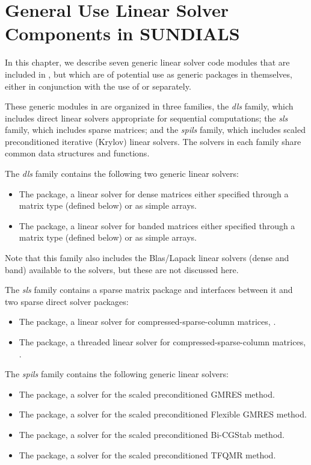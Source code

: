 \chapter{General Use Linear Solver Components in SUNDIALS}\label{s:gen_linsolv}
In this chapter, we describe seven generic linear solver code modules that 
are included in {\sundials}, 
but which are of potential use as generic packages in
themselves, either in conjunction with the use of {\sundials} or separately.

These generic modules in {\sundials} are organized in
three families, the {\em dls} family, which includes direct
linear solvers appropriate for sequential computations; the {\em sls}
family, which includes sparse matrices; and the {\em spils}
family, which includes scaled preconditioned iterative (Krylov) linear solvers.
The solvers in each family share common data structures and functions.

The {\em dls} family contains the following two generic linear solvers:
\begin{itemize}
\item The {\dense} package, a linear solver for dense matrices either specified 
  through a matrix type (defined below) or as simple arrays.
\item The {\band} package, a linear solver for banded matrices either specified 
  through a matrix type (defined below) or as simple arrays.
\end{itemize}
Note that this family also includes the Blas/Lapack linear solvers (dense and band) 
available to the {\sundials} solvers, but these are not discussed here.

The {\em sls} family contains a sparse matrix package and interfaces between
it and two sparse direct solver packages:
\begin{itemize}
\item The {\klu} package, a linear solver for compressed-sparse-column
  matrices, \cite{KLU_site,DaPa:10}.
\item The {\superlumt} package, a threaded linear solver for
  compressed-sparse-column matrices, \cite{SuperLUMT_site,Li:05,DGL:99}.
\end{itemize}

The {\em spils} family contains the following generic linear solvers:
\begin{itemize}
\item The {\spgmr} package, a solver for the scaled preconditioned GMRES method.
\item The {\spfgmr} package, a solver for the scaled preconditioned Flexible GMRES method.
\item The {\spbcg} package, a solver for the scaled preconditioned Bi-CGStab method.
\item The {\sptfqmr} package, a solver for the scaled preconditioned TFQMR method.
\end{itemize}

